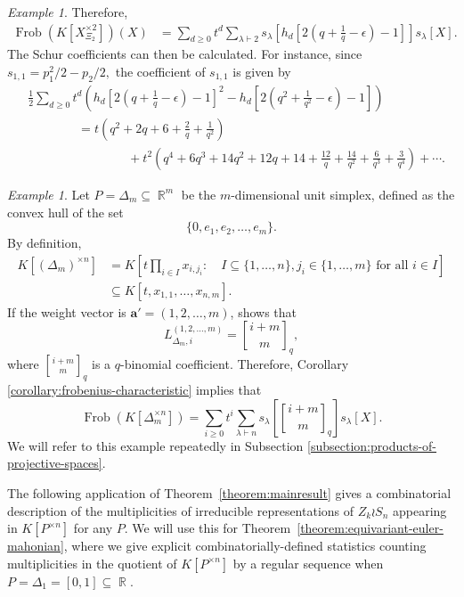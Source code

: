 \documentclass[a4paper,12pt]{amsart}
\theoremstyle{plain}
\theoremstyle{definition}
\theoremstyle{remark}
\newtheorem{example}[theorem]{Example}
\DeclareMathOperator{\RR}{\mathbb{R}}
\DeclareMathOperator{\Frob}{Frob}
\newcommand{\qbinom}{\genfrac{[}{]}{0pt}{}}
\begin{document}
\begin{example}
Therefore,
\begin{align*}
    \Frob(K[X_{\Xi_2}^{\times 2}])(X) 
    &= \sum_{d\geq 0 } t^d 
    \sum_{\lambda \vdash 2} s_\lambda \left[ h_d\left[ 2 \left(q+\frac{1}{q} - \epsilon \right) -1 \right]\right] s_\lambda[X].
\end{align*}
The Schur coefficients can then be calculated. For instance, since $s_{1,1} = p_{1}^2/2 -p_2/2 ,$ the coefficient of $s_{1,1}$ is given by
\begin{align*} &
\frac{1}{2} \sum_{d \geq 0 } t^d
\left( h_d\left[ 2 \left(q+\frac{1}{q} - \epsilon \right) -1 \right]^2 - 
 h_d\left[ 2 \left(q^2+\frac{1}{q^2} - \epsilon \right) -1 \right]
\right) \\
 & \hspace{4em} =t \left( q^2+2q+6+\frac{2}{q}+\frac{1}{q^2} \right) \\
  & \hspace{8em}+ 
 t^2 \left(q^4+6 q^3+14 q^2+12 q+14+ \frac{12}{q}+ \frac{14}{q^2}+ \frac{6}{q^3} + \frac{3}{q^4} \right) + \cdots.
\end{align*}
\end{example}

\begin{example}\label{example:product-of-unit-simplices}
    Let $P = \Delta_m \subseteq \RR^m$ be the $m$-dimensional unit simplex, defined as the convex hull of the set
    \[
    \{0, e_1, e_2, \ldots, e_m\}.
    \]
    By definition,
    \begin{align*}
    K[(\Delta_m)^{\times n}] 
    &= K \left [ t \prod_{i \in I} x_{i, j_i}: \quad I \subseteq \{1, \ldots, n\}, j_i \in \{1, \ldots, m\} \text{ for all } i \in I \right ] \\
    &\subseteq K[t, x_{1, 1}, \ldots, x_{n, m}].
    \end{align*}
    If the weight vector is $\bm{a}' = (1, 2, \ldots, m)$, \cite{adeyemo-szendroi-refined} shows that
    \[
    L_{\Delta_m, i}^{(1, 2, \ldots, m)} = \qbinom{i + m}{m}_q,
    \]
    where $\qbinom{i + m}{m}_q$ is a $q$-binomial coefficient. Therefore, Corollary \ref{corollary:frobenius-characteristic} implies that
    \[
    \Frob(K[\Delta_m^{\times n}]) = \sum_{i \geq 0} t^i \sum_{\lambda \vdash n} s_\lambda \left [ \qbinom{i + m}{m}_q   \right ] s_\lambda[X].
    \]
    We will refer to this example repeatedly in Subsection \ref{subsection:products-of-projective-spaces}.
\end{example}
The following application of Theorem~\ref{theorem:mainresult} gives a combinatorial description of the multiplicities of irreducible representations of $Z_k \wr S_n$ appearing in $K[P^{\times n}]$ for any $P$. We will use this for Theorem~\ref{theorem:equivariant-euler-mahonian}, where we give explicit combinatorially-defined statistics counting multiplicities in the quotient of $K[P^{\times n}]$ by a regular sequence when $P = \Delta_1 = [0, 1] \subseteq \RR$.
\end{document}
